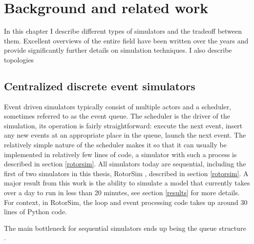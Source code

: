 \chapter{Background and related work} \label{background}

In this chapter I describe different types of simulators and the tradeoff between them.
Excellent overviews of the entire field have been written over the years \cite{fujimoto_parallel_2001, fujimoto_computational_2017} and provide significantly further details on simulation techniques.
I also describe \datacenter topologies

\section{Centralized discrete event simulators} \label{sequential-sim}

Event driven simulators typically consist of multiple actors and a scheduler, sometimes referred to as the event queue.
The scheduler is the driver of the simulation, its operation is fairly straightforward: execute the next event, insert any new events at an appropriate place in the queue, launch the next event.
The relatively simple nature of the scheduler makes it so that it can usually be implemented in relatively few lines of code, a simulator with such a process is described in section \ref{rotorsim}.
All \datacenter simulators today are sequential, including the first of two simulators in this thesis, RotorSim \cite{brode-roger_nibriviarotorsim_2020} , described in section \ref{rotorsim}.
A major result from this work is the ability to simulate a \dc model that currently takes over a day to run in less than 20 minutes, see section \ref{results} for more details.
For context, in RotorSim, the loop and event processing code takes up around 30 lines of Python code.

The main bottleneck for sequential simulators ends up being the queue structure \cite{}. %

